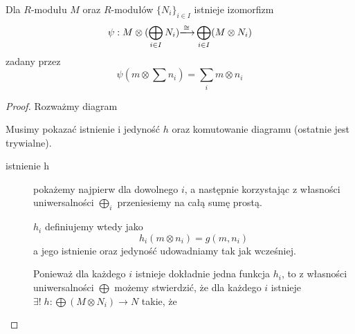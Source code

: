\begin{remark}
  Dla $R$-modułu $M$ oraz $R$-modułów $\{N_i\}_{i\in I}$ istnieje izomorfizm
  $$\psi:M\otimes (\bigoplus_{i\in I} N_i)\isomorphism \bigoplus_{i\in I} (M\otimes N_i)$$
  zadany przez
  $$\psi(m\otimes\sum n_i)=\sum_im\otimes n_i$$
\end{remark}

\begin{proof}
  Rozważmy diagram

  \begin{center}\end{center}
  Musimy pokazać istnienie i jedyność $h$ oraz komutowanie diagramu (ostatnie jest trywialne).

  \begin{description}
    \item[istnienie h] pokażemy najpierw dla dowolnego $i$, a następnie korzystając z własności uniwersalności $\bigoplus_i$ przeniesiemy na całą sumę prostą.

      \begin{center}\end{center}
      $h_i$ definiujemy wtedy jako
      $$h_i(m\otimes n_i)=g(m, n_i)$$
      a jego istnienie oraz jedyność udowadniamy tak jak wcześniej.

      Ponieważ dla każdego $i$ istnieje dokładnie jedna funkcja $h_i$, to z własności uniwersalności $\bigoplus$ możemy stwierdzić, że dla każdego $i$ istnieje $\exists!\;h:\bigoplus (M\otimes N_i)\to N$ takie, że
      
      \begin{center}\end{center}


\end{description}
\end{proof}
